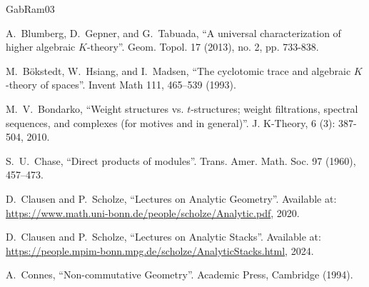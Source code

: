 \documentclass[11pt,leqno]{amsart}
\numberwithin{equation}{section}
\begin{document}
\begin{thebibliography}{GabRam03}


 A.~Blumberg, D.~Gepner, and G.~Tabuada, ``A universal characterization of higher algebraic $K$-theory''. Geom. Topol.
17 (2013), no. 2, pp. 733-838.

 M.~B\"okstedt, W.~Hsiang, and I.~Madsen, ``The cyclotomic trace and algebraic $K$-theory of spaces''.  Invent Math 111, 465–539 (1993).

 M.~V.~Bondarko, ``Weight structures vs. $t$-structures; weight filtrations, spectral sequences, and complexes (for motives and in general)''. J. K-Theory, 6 (3): 387-504, 2010.






S.~U.~Chase, ``Direct products of modules''. Trans. Amer. Math. Soc. 97 (1960), 457–473.

D.~Clausen and P.~Scholze, ``Lectures on Analytic Geometry''. Available at: \url{https://www.math.uni-bonn.de/people/scholze/Analytic.pdf},
2020.

 D.~Clausen and P.~Scholze, ``Lectures on Analytic Stacks''. Available at: \url{https://people.mpim-bonn.mpg.de/scholze/AnalyticStacks.html}, 2024.

 A.~Connes, ``Non-commutative Geometry''. Academic Press, Cambridge (1994).


\end{thebibliography}
\end{document}
